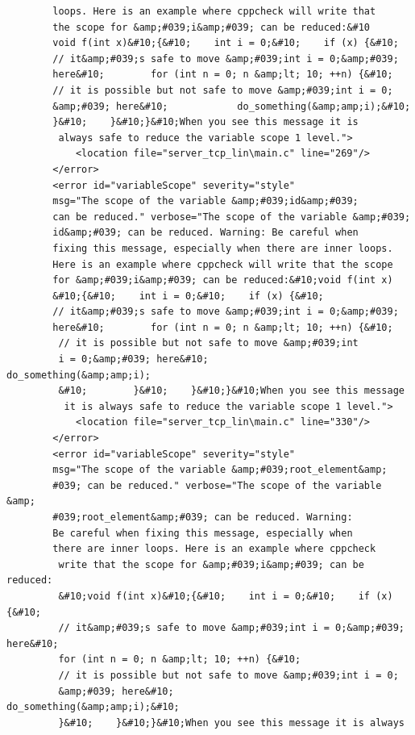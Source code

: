 \documentclass[10pt,a4paper]{report}
\begin{document}
\begin{lstlisting}
        loops. Here is an example where cppcheck will write that 
        the scope for &amp;#039;i&amp;#039; can be reduced:&#10
        void f(int x)&#10;{&#10;    int i = 0;&#10;    if (x) {&#10;        
        // it&amp;#039;s safe to move &amp;#039;int i = 0;&amp;#039; 
        here&#10;        for (int n = 0; n &amp;lt; 10; ++n) {&#10;            
        // it is possible but not safe to move &amp;#039;int i = 0;
        &amp;#039; here&#10;            do_something(&amp;amp;i);&#10;        
        }&#10;    }&#10;}&#10;When you see this message it is
         always safe to reduce the variable scope 1 level.">
            <location file="server_tcp_lin\main.c" line="269"/>
        </error>
        <error id="variableScope" severity="style" 
        msg="The scope of the variable &amp;#039;id&amp;#039; 
        can be reduced." verbose="The scope of the variable &amp;#039;
        id&amp;#039; can be reduced. Warning: Be careful when 
        fixing this message, especially when there are inner loops. 
        Here is an example where cppcheck will write that the scope 
        for &amp;#039;i&amp;#039; can be reduced:&#10;void f(int x)
        &#10;{&#10;    int i = 0;&#10;    if (x) {&#10;        
        // it&amp;#039;s safe to move &amp;#039;int i = 0;&amp;#039; 
        here&#10;        for (int n = 0; n &amp;lt; 10; ++n) {&#10;           
         // it is possible but not safe to move &amp;#039;int 
         i = 0;&amp;#039; here&#10;            do_something(&amp;amp;i);
         &#10;        }&#10;    }&#10;}&#10;When you see this message
          it is always safe to reduce the variable scope 1 level.">
            <location file="server_tcp_lin\main.c" line="330"/>
        </error>
        <error id="variableScope" severity="style" 
        msg="The scope of the variable &amp;#039;root_element&amp;
        #039; can be reduced." verbose="The scope of the variable &amp;
        #039;root_element&amp;#039; can be reduced. Warning: 
        Be careful when fixing this message, especially when 
        there are inner loops. Here is an example where cppcheck 
         write that the scope for &amp;#039;i&amp;#039; can be reduced:
         &#10;void f(int x)&#10;{&#10;    int i = 0;&#10;    if (x) {&#10;        
         // it&amp;#039;s safe to move &amp;#039;int i = 0;&amp;#039; here&#10;        
         for (int n = 0; n &amp;lt; 10; ++n) {&#10;            
         // it is possible but not safe to move &amp;#039;int i = 0;
         &amp;#039; here&#10;            do_something(&amp;amp;i);&#10;        
         }&#10;    }&#10;}&#10;When you see this message it is always

\end{lstlisting}
\end{document}
